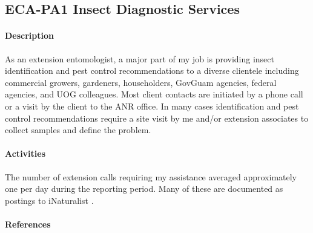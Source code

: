 \subsection{ECA-PA1 Insect Diagnostic Services}
\begin{refsection}

\paragraph{Description}	
As an extension entomologist, a major part of my job is providing
insect identification and pest control recommendations to a diverse
clientele including commercial growers, gardeners, householders, GovGuam
agencies, federal agencies, and UOG colleagues. Most client contacts
are initiated by a phone call or a visit by the client to the ANR
office. In many cases identification and pest control recommendations
require a site visit by me and/or extension associates to collect
samples and define the problem.

\paragraph{Activities}
The number of extension calls requiring my assistance averaged approximately
one per day during the reporting period. Many of these are documented
as postings to iNaturalist \cite{moore_inat_from_2020-06-26_to_2023-06-26}.

\paragraph{References}

\printbibliography[heading=none]
\end{refsection}

